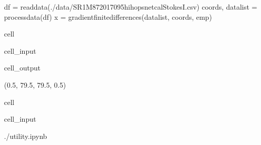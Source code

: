 \documentclass[letterpaper,10pt,english]{jupyterBook}
\begin{document}
\begin{sphinxVerbatim}[commandchars=\\\{\}]
df = read\PYGZus{}data(\PYGZdq{}./data/SR1\PYGZus{}M87\PYGZus{}2017\PYGZus{}095\PYGZus{}hi\PYGZus{}hops\PYGZus{}netcal\PYGZus{}StokesI.csv\PYGZdq{})
coords, data\PYGZus{}list = process\PYGZus{}data(df)
x = gradient\PYGZus{}finite\PYGZus{}differences(data\PYGZus{}list, coords, emp)
\end{sphinxVerbatim}

\begin{sphinxuseclass}{cell}\begin{sphinxVerbatimInput}

\begin{sphinxuseclass}{cell_input}
\begin{sphinxVerbatim}[commandchars=\\\{\}]
    
\end{sphinxVerbatim}

\end{sphinxuseclass}\end{sphinxVerbatimInput}
\begin{sphinxVerbatimOutput}

\begin{sphinxuseclass}{cell_output}
\begin{sphinxVerbatim}[commandchars=\\\{\}]
(\PYGZhy{}0.5, 79.5, 79.5, \PYGZhy{}0.5)
\end{sphinxVerbatim}

\noindent{}

\end{sphinxuseclass}\end{sphinxVerbatimOutput}

\end{sphinxuseclass}
\sphinxstepscope

\begin{sphinxuseclass}{cell}\begin{sphinxVerbatimInput}

\begin{sphinxuseclass}{cell_input}
\begin{sphinxVerbatim}[commandchars=\\\{\}]
 ./utility.ipynb
\end{sphinxVerbatim}

\end{sphinxuseclass}\end{sphinxVerbatimInput}

\end{sphinxuseclass}
\end{document}
